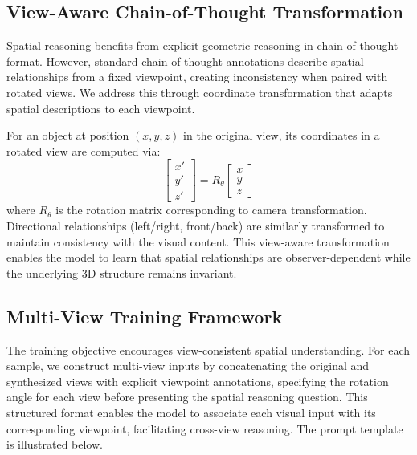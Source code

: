 \subsection{View-Aware Chain-of-Thought Transformation}

Spatial reasoning benefits from explicit geometric reasoning in chain-of-thought format. However, standard chain-of-thought annotations describe spatial relationships from a fixed viewpoint, creating inconsistency when paired with rotated views. We address this through coordinate transformation that adapts spatial descriptions to each viewpoint.

For an object at position $(x, y, z)$ in the original view, its coordinates in a rotated view are computed via:
\begin{equation}
\begin{bmatrix} x' \\ y' \\ z' \end{bmatrix} = R_\theta \begin{bmatrix} x \\ y \\ z \end{bmatrix}
\end{equation}
where $R_\theta$ is the rotation matrix corresponding to camera transformation. Directional relationships (left/right, front/back) are similarly transformed to maintain consistency with the visual content. This view-aware transformation enables the model to learn that spatial relationships are observer-dependent while the underlying 3D structure remains invariant.

\subsection{Multi-View Training Framework}

The training objective encourages view-consistent spatial understanding. For each sample, we construct multi-view inputs by concatenating the original and synthesized views with explicit viewpoint annotations, specifying the rotation angle for each view before presenting the spatial reasoning question. This structured format enables the model to associate each visual input with its corresponding viewpoint, facilitating cross-view reasoning. The prompt template is illustrated below.

